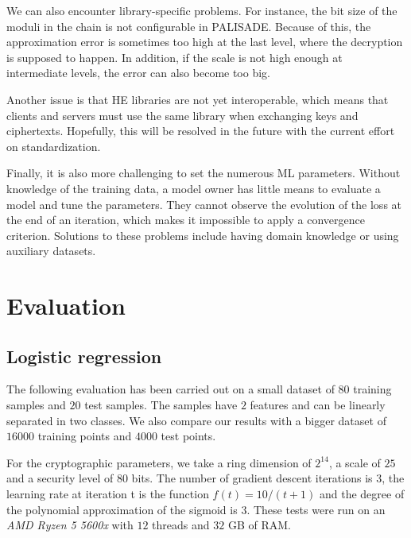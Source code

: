 \documentclass[a4paper,11pt,oneside]{report}
\begin{document}
We can also encounter library-specific problems. 
For instance, the bit size of the moduli in the chain is not configurable in PALISADE. 
Because of this, the approximation error is sometimes too high at the last level, where the decryption is supposed to happen.
In addition, if the scale is not high enough at intermediate levels, the error can also become too big.

Another issue is that HE libraries are not yet interoperable, which means that clients and servers must use the same library when exchanging keys and ciphertexts. 
Hopefully, this will be resolved in the future with the current effort on standardization.

Finally, it is also more challenging to set the numerous ML parameters.
Without knowledge of the training data, a model owner has little means to evaluate a model and tune the parameters.
They cannot observe the evolution of the loss at the end of an iteration, which makes it impossible to apply a convergence criterion.
Solutions to these problems include having domain knowledge or using auxiliary datasets.


\chapter{Evaluation}\label{chap:evaluation}


\section{Logistic regression}\label{sec:eval_lr}

The following evaluation has been carried out on a small dataset of $80$ training samples and $20$ test samples. 
The samples have $2$ features and can be linearly separated in two classes.
We also compare our results with a bigger dataset of $16000$ training points and $4000$ test points.

For the cryptographic parameters, we take a ring dimension of $2^{14}$, a scale of $25$ and a security level of $80$ bits. 
The number of gradient descent iterations is $3$, the learning rate at iteration t is the function $f(t) = 10 / (t+1)$ and the degree of the polynomial approximation of the sigmoid is $3$.
These tests were run on an \emph{AMD Ryzen 5 5600x} with $12$ threads and $32$ GB of RAM.
\end{document}

